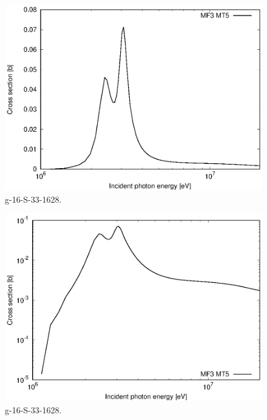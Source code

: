 \begin{figure}
 \includegraphics[width=\linewidth]{eps/g_16-S-33_1628.eps}
  \caption{g-16-S-33-1628.}
\end{figure}
\begin{figure}
 \includegraphics[width=\linewidth]{eps-log/g_16-S-33_1628.eps}
 \caption{g-16-S-33-1628.}
\end{figure}
\newpage \clearpage

